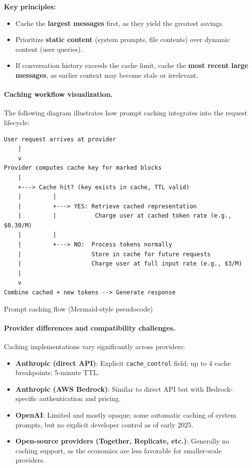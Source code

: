 \documentclass[english]{article}
\begin{document}
\textbf{Key principles:}
\begin{itemize}
    \item Cache the \textbf{largest messages} first, as they yield the greatest savings.
    \item Prioritize \textbf{static content} (system prompts, file contents) over dynamic content (user queries).
    \item If conversation history exceeds the cache limit, cache the \textbf{most recent large messages}, as earlier context may become stale or irrelevant.
\end{itemize}

\paragraph{Caching workflow visualization.}

The following diagram illustrates how prompt caching integrates into the request lifecycle:

\begin{listing}[H]
\begin{verbatim}
User request arrives at provider
    |
    v
Provider computes cache key for marked blocks
    |
    +---> Cache hit? (key exists in cache, TTL valid)
    |         |
    |         +---> YES: Retrieve cached representation
    |         |           Charge user at cached token rate (e.g., $0.30/M)
    |         |
    |         +---> NO:  Process tokens normally
    |                    Store in cache for future requests
    |                    Charge user at full input rate (e.g., $3/M)
    |
    v
Combine cached + new tokens --> Generate response
\end{verbatim}
\caption{Prompt caching flow (Mermaid-style pseudocode)}
\end{listing}

\paragraph{Provider differences and compatibility challenges.}

Caching implementations vary significantly across providers:
\begin{itemize}
    \item \textbf{Anthropic (direct API)}: Explicit \texttt{cache\_control} field; up to 4 cache breakpoints; 5-minute TTL.
    \item \textbf{Anthropic (AWS Bedrock)}: Similar to direct API but with Bedrock-specific authentication and pricing.
    \item \textbf{OpenAI}: Limited and mostly opaque; some automatic caching of system prompts, but no explicit developer control as of early 2025.
    \item \textbf{Open-source providers (Together, Replicate, etc.)}: Generally no caching support, as the economics are less favorable for smaller-scale providers.
\end{itemize}
\end{document}

